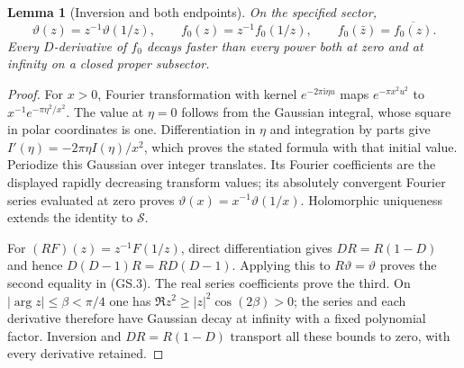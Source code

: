 \documentclass[11pt]{article}
\newtheorem{lemma}[theorem]{Lemma}
\newcommand{\ii}{\mathrm i}
\begin{document}
\begin{lemma}[Inversion and both endpoints]
On the specified sector,
\begin{equation}
 \vartheta(z)=z^{-1}\vartheta(1/z),\qquad
 f_0(z)=z^{-1}f_0(1/z),\qquad
 f_0(\bar z)=\overline{f_0(z)}.\tag{GS.3}
\end{equation}
Every $D$-derivative of $f_0$ decays faster than every power both at
zero and at infinity on a closed proper subsector.
\end{lemma}
\begin{proof}
For $x>0$, Fourier transformation with kernel $e^{-2\pi\ii \eta u}$
maps $e^{-\pi x^2u^2}$ to $x^{-1}e^{-\pi\eta^2/x^2}$.
The value at $\eta=0$ follows from the Gaussian integral, whose
square in polar coordinates is one. Differentiation in $\eta$ and
integration by parts give $I'(\eta)=-2\pi\eta I(\eta)/x^2$,
which proves the stated formula with that initial value.
Periodize this Gaussian over integer translates. Its Fourier
coefficients are the displayed rapidly decreasing transform values;
its absolutely convergent Fourier series evaluated at zero proves
$\vartheta(x)=x^{-1}\vartheta(1/x)$. Holomorphic uniqueness extends
the identity to $\mathcal S$.

For $(RF)(z)=z^{-1}F(1/z)$, direct differentiation gives
$DR=R(1-D)$ and hence $D(D-1)R=RD(D-1)$. Applying this to
$R\vartheta=\vartheta$ proves the second equality in (GS.3).
The real series coefficients prove the third. On
$|\arg z|\le\beta<\pi/4$ one has
$\Re z^2\ge |z|^2\cos(2\beta)>0$; the series and each
derivative therefore have Gaussian decay at infinity with a fixed
polynomial factor. Inversion and $DR=R(1-D)$ transport all these
bounds to zero, with every derivative retained.
\end{proof}
\end{document}
